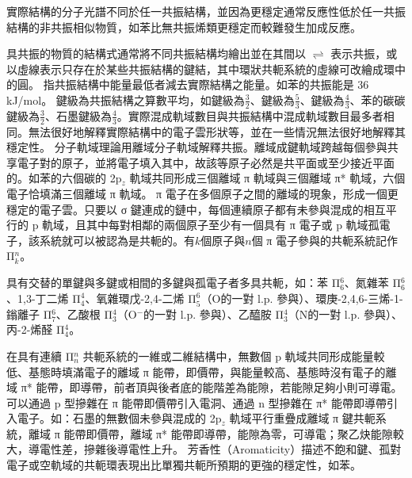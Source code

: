 \documentclass[a4paper,12pt]{report}
\begin{document}
實際結構的分子光譜不同於任一共振結構，並因為更穩定通常反應性低於任一共振結構的非共振相似物質，如苯比無共振烯類更穩定而較難發生加成反應。

具共振的物質的結構式通常將不同共振結構均繪出並在其間以 $\rightleftharpoons$ 表示共振，或以虛線表示只存在於某些共振結構的鍵結，其中環狀共軛系統的虛線可改繪成環中的圓。
指共振結構中能量最低者減去實際結構之能量。如苯的共振能是 36 kJ/mol。
鍵級為共振結構之算數平均，如鍵級為$\frac{3}{2}$、鍵級為$\frac{5}{3}$、鍵級為$\frac{4}{3}$、苯的碳碳鍵級為$\frac{3}{2}$、石墨鍵級為$\frac{4}{3}$。實際混成軌域數目與共振結構中混成軌域數目最多者相同。無法很好地解釋實際結構中的電子雲形狀等，並在一些情況無法很好地解釋其穩定性。
分子軌域理論用離域分子軌域解釋共振。離域成鍵軌域跨越每個參與共享電子對的原子，並將電子填入其中，故該等原子必然是共平面或至少接近平面的。如苯的六個碳的 2p$_z$ 軌域共同形成三個離域 π 軌域與三個離域 π* 軌域，六個電子恰填滿三個離域 π 軌域。
π 電子在多個原子之間的離域的現象，形成一個更穩定的電子雲。只要以 σ 鍵連成的鏈中，每個連續原子都有未參與混成的相互平行的 p 軌域，且其中每對相鄰的兩個原子至少有一個具有 π 電子或 p 軌域孤電子，該系統就可以被認為是共軛的。有$k$個原子與$n$個 π 電子參與的共軛系統記作 Π$_k^n$。

具有交替的單鍵與多鍵或相間的多鍵與孤電子者多具共軛，如：苯 Π$_6^6$、氮雜苯 Π$_6^6$、1,3-丁二烯 Π$_4^4$、氧雜環戊-2,4-二烯 Π$_5^6$（O的一對 l.p. 參與）、環庚-2,4,6-三烯-1-鎓離子 Π$_7^6$、乙酸根 Π$_3^4$（O$^-$的一對 l.p. 參與）、乙醯胺 Π$_3^4$（N的一對 l.p. 參與）、丙-2-烯醛 Π$_4^4$。

在具有連續 Π$_n^n$ 共軛系統的一維或二維結構中，無數個 p 軌域共同形成能量較低、基態時填滿電子的離域 π 能帶，即價帶，與能量較高、基態時沒有電子的離域 π* 能帶，即導帶，前者頂與後者底的能階差為能隙，若能隙足夠小則可導電。可以通過 p 型摻雜在 π 能帶即價帶引入電洞、通過 n 型摻雜在 π* 能帶即導帶引入電子。如：石墨的無數個未參與混成的 2p$_z$ 軌域平行重疊成離域 π 鍵共軛系統，離域 π 能帶即價帶，離域 π* 能帶即導帶，能隙為零，可導電；聚乙炔能隙較大，導電性差，摻雜後導電性上升。
芳香性（Aromaticity）描述不飽和鍵、孤對電子或空軌域的共軛環表現出比單獨共軛所預期的更強的穩定性，如苯。
\end{document}

